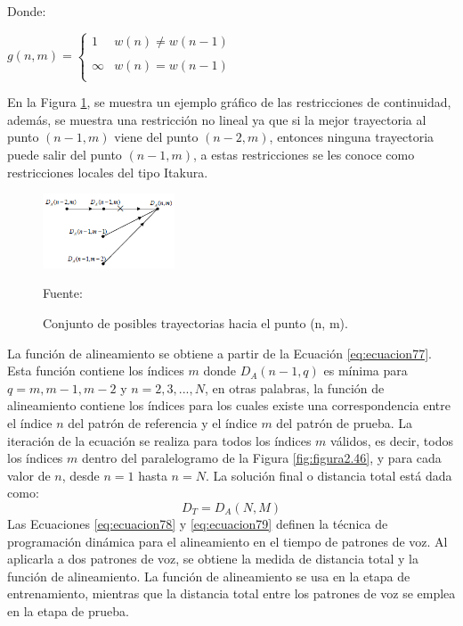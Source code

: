 \begin{enumerate}
Donde:
\vskip 0.2cm
\begin{center}
$
g(n,m) = \left\{ \begin{array}{lcl}
1 & w(n) \neq w(n-1) \\
& \\
\infty & w(n) = w(n-1) \\
\end{array}
\right.
$
\end{center}
\vskip 0.2cm
En la Figura \ref{fig:figura2.48}, se muestra un ejemplo gráfico de las restricciones de continuidad, además, se muestra una restricción no lineal ya que si la mejor trayectoria al punto $(n - 1, m)$ viene del punto $(n - 2, m)$, entonces ninguna trayectoria puede salir del punto $(n - 1, m)$, a estas restricciones se les conoce como restricciones locales del tipo Itakura.
\begin{figure}[H]
\begin{center}
\includegraphics[width=0.35\textwidth]{Imagenes/Cap2/image049}
\end{center}
\begin{center}
\vskip -0.5cm
\caption{\small{Conjunto de posibles trayectorias hacia el punto (n, m).}}
\label{fig:figura2.48}
{\small{Fuente: \cite{rabiner}}}
\end{center}
\end{figure}
\vskip -1.0cm
La función de alineamiento se obtiene a partir de la Ecuación \eqref{eq:ecuacion77}. Esta función contiene los índices $m$ donde $D_{A}(n - 1, q)$ es mínima para $q = m, m-1, m-2$ y $n = 2,3,...,N$, en otras palabras, la función de alineamiento contiene los índices para los cuales existe una correspondencia entre el índice $n$ del patrón de referencia y el índice $m$ del patrón de prueba. La iteración de la ecuación se realiza para todos los índices $m$ válidos, es decir, todos los índices $m$ dentro del paralelogramo de la Figura \ref{fig:figura2.46}, y para cada valor de $n$, desde $n = 1$ hasta $n = N$. La solución final o distancia total está dada como:
\begin{equation}
\label{eq:ecuacion79}
D_{T} = D_{A}(N,M)
\end{equation}
Las Ecuaciones \eqref{eq:ecuacion78} y \eqref{eq:ecuacion79} definen la técnica de programación dinámica para el alineamiento en el tiempo de patrones de voz. Al aplicarla a dos patrones de voz, se obtiene la medida de distancia total y la función de alineamiento. La función de alineamiento se usa en la etapa de entrenamiento, mientras que la distancia total entre los patrones de voz se emplea en la etapa de prueba.

\end{enumerate}
